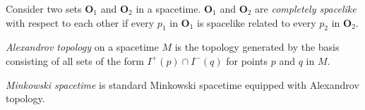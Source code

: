 \begin{definition}
    \label{def:completely-spacelike}
    \leanok
    Consider two sets $\mathbf{O}_1$ and $\mathbf{O}_2$ in a spacetime. $\mathbf{O}_1$ and $\mathbf{O}_2$ are \textit{completely spacelike}  with respect to each other if every $p_1$ in $\mathbf{O}_1$ is spacelike related to every $p_2$ in $\mathbf{O}_2$.
\end{definition}

\begin{definition}
    \label{def:alexandrov-topology}
    \leanok
    \textit{Alexandrov topology} on a spacetime $M$ is the topology generated by the basis consisting of all sets of the form $I^+(p) \cap I^-(q)$ for points $p$ and $q$ in $M$.
\end{definition}

\begin{definition}
    \label{def:minkowski-spacetime}
    \leanok
    \textit{Minkowski spacetime} is standard Minkowski spacetime equipped with Alexandrov topology.
\end{definition}
